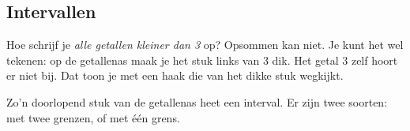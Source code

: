 \begin{oefeningen}
\end{oefeningen}

\subsection{Intervallen}

Hoe schrijf je \textit{alle getallen kleiner dan 3} op? Opsommen kan niet. Je kunt het wel tekenen: op de getallenas maak je het stuk links van 3 dik. Het getal 3 zelf hoort er niet bij. Dat toon je met een haak die van het dikke stuk wegkijkt.


Zo'n doorlopend stuk van de getallenas heet een interval. Er zijn twee soorten: met twee grenzen, of met één grens.

